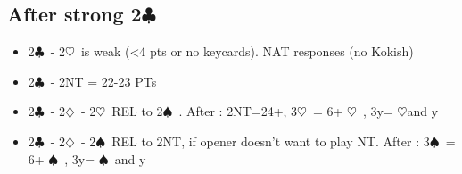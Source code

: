 \documentclass{article}
\newcommand\C{\ensuremath{\clubsuit}}
\newcommand\D{\ensuremath{\diamondsuit}}
\renewcommand\H{\ensuremath{\heartsuit}}
\renewcommand\S{\ensuremath{\spadesuit}}
\begin{document}
\begin{multicols}{2}


 \subsection{After strong 2\C\ }
 \label{kokish}
 \begin{itemize}
   \item 2\C\ - 2\H\ is weak (<4 pts or no keycards). NAT responses (no Kokish)
   \item 2\C\ - 2NT = 22-23 PTs
   \item 2\C\ - 2\D\ - 2\H\ REL to 2\S\ .  After : 2NT=24+, 3\H\ = 6+ \H\ , 3y= \H and y
   \item 2\C\ - 2\D\ - 2\S\ REL to 2NT, if opener doesn't want to play NT. After :  3\S\ = 6+ \S\ , 3y= \S\ and y
   \end{itemize}

\end{multicols}
\end{document}
